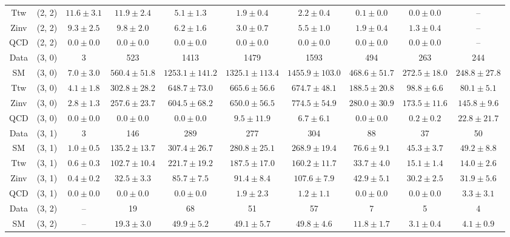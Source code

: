 \begin{table}[h!]
{\begin{tabular}{cccccccccc}
	Ttw & (2, 2) & $11.6\pm 3.1$ & $11.9\pm 2.4$ & $5.1\pm 1.3$ & $1.9\pm 0.4$ & $2.2\pm 0.4$ & $0.1\pm 0.0$ & $0.0\pm 0.0$ & -- \\[0.5ex] 
	Zinv & (2, 2) & $9.3\pm 2.5$ & $9.8\pm 2.0$ & $6.2\pm 1.6$ & $3.0\pm 0.7$ & $5.5\pm 1.0$ & $1.9\pm 0.4$ & $1.3\pm 0.4$ & -- \\[0.5ex] 
	QCD & (2, 2) & $0.0\pm 0.0$ & $0.0\pm 0.0$ & $0.0\pm 0.0$ & $0.0\pm 0.0$ & $0.0\pm 0.0$ & $0.0\pm 0.0$ & $0.0\pm 0.0$ & -- \\[0.5ex] 
	Data & (3, 0) & 3 & 523 & 1413 & 1479 & 1593 & 494 & 263 & 244 \\[0.5ex] 
	SM & (3, 0) & $7.0\pm 3.0$ & $560.4\pm 51.8$ & $1253.1\pm 141.2$ & $1325.1\pm 113.4$ & $1455.9\pm 103.0$ & $468.6\pm 51.7$ & $272.5\pm 18.0$ & $248.8\pm 27.8$ \\[0.5ex] 
	Ttw & (3, 0) & $4.1\pm 1.8$ & $302.8\pm 28.2$ & $648.7\pm 73.0$ & $665.6\pm 56.6$ & $674.7\pm 48.1$ & $188.5\pm 20.8$ & $98.8\pm 6.6$ & $80.1\pm 5.1$ \\[0.5ex] 
	Zinv & (3, 0) & $2.8\pm 1.3$ & $257.6\pm 23.7$ & $604.5\pm 68.2$ & $650.0\pm 56.5$ & $774.5\pm 54.9$ & $280.0\pm 30.9$ & $173.5\pm 11.6$ & $145.8\pm 9.6$ \\[0.5ex] 
	QCD & (3, 0) & $0.0\pm 0.0$ & $0.0\pm 0.0$ & $0.0\pm 0.0$ & $9.5\pm 11.9$ & $6.7\pm 6.1$ & $0.0\pm 0.0$ & $0.2\pm 0.2$ & $22.8\pm 21.7$ \\[0.5ex] 
	Data & (3, 1) & 3 & 146 & 289 & 277 & 304 & 88 & 37 & 50 \\[0.5ex] 
	SM & (3, 1) & $1.0\pm 0.5$ & $135.2\pm 13.7$ & $307.4\pm 26.7$ & $280.8\pm 25.1$ & $268.9\pm 19.4$ & $76.6\pm 9.1$ & $45.3\pm 3.7$ & $49.2\pm 8.8$ \\[0.5ex] 
	Ttw & (3, 1) & $0.6\pm 0.3$ & $102.7\pm 10.4$ & $221.7\pm 19.2$ & $187.5\pm 17.0$ & $160.2\pm 11.7$ & $33.7\pm 4.0$ & $15.1\pm 1.4$ & $14.0\pm 2.6$ \\[0.5ex] 
	Zinv & (3, 1) & $0.4\pm 0.2$ & $32.5\pm 3.3$ & $85.7\pm 7.5$ & $91.4\pm 8.4$ & $107.6\pm 7.9$ & $42.9\pm 5.1$ & $30.2\pm 2.5$ & $31.9\pm 5.6$ \\[0.5ex] 
	QCD & (3, 1) & $0.0\pm 0.0$ & $0.0\pm 0.0$ & $0.0\pm 0.0$ & $1.9\pm 2.3$ & $1.2\pm 1.1$ & $0.0\pm 0.0$ & $0.0\pm 0.0$ & $3.3\pm 3.1$ \\[0.5ex] 
	Data & (3, 2) & -- & 19 & 68 & 51 & 57 & 7 & 5 & 4 \\[0.5ex] 
	SM & (3, 2) & -- & $19.3\pm 3.0$ & $49.9\pm 5.2$ & $49.1\pm 5.7$ & $49.8\pm 4.6$ & $11.8\pm 1.7$ & $3.1\pm 0.4$ & $4.1\pm 0.9$ \\[0.5ex] 

\end{tabular}}
\end{table}
